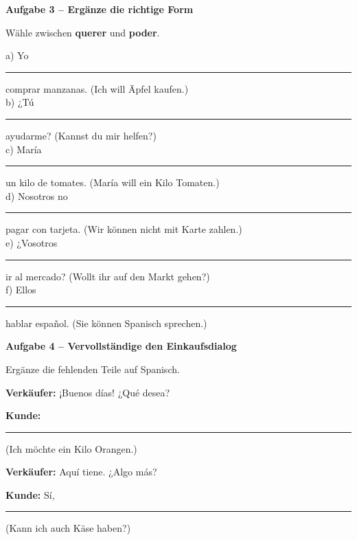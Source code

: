 \documentclass[11pt, a4paper]{article}
\newcommand{\fachfarbe}{spanisch}
\newcommand{\punktebox}[1]{\hfill\fbox{\small \_/#1}}
\newcommand{\luecke}[1]{\rule{#1}{0.4pt}}
\newenvironment{aufgabe}[1]{%
    \needspace{5\baselineskip}%
    \nopagebreak[4]%
    \vspace{10pt}
    \noindent\textbf{\textcolor{\fachfarbe}{Aufgabe #1}}
    \nopagebreak[4]%
    \vspace{5pt}
    \nopagebreak[4]%
    \begin{list}{}{\leftmargin=0pt}
    \item[]
}{%
    \end{list}
}
\newcommand{\es}[1]{\textcolor{\fachfarbe}{\textbf{#1}}}
\begin{document}
\vspace{10pt}


\begin{aufgabe}{3 -- Ergänze die richtige Form}
Wähle zwischen \es{querer} und \es{poder}. \punktebox{6}
\end{aufgabe}

\noindent
a) Yo \luecke{2.5cm} comprar manzanas. (Ich will Äpfel kaufen.) \\[0.8em]
b) ¿Tú \luecke{2.5cm} ayudarme? (Kannst du mir helfen?) \\[0.8em]
c) María \luecke{2.5cm} un kilo de tomates. (María will ein Kilo Tomaten.) \\[0.8em]
d) Nosotros no \luecke{2.5cm} pagar con tarjeta. (Wir können nicht mit Karte zahlen.) \\[0.8em]
e) ¿Vosotros \luecke{2.5cm} ir al mercado? (Wollt ihr auf den Markt gehen?) \\[0.8em]
f) Ellos \luecke{2.5cm} hablar español. (Sie können Spanisch sprechen.) \\

\vspace{15pt}


\begin{aufgabe}{4 -- Vervollständige den Einkaufsdialog}
Ergänze die fehlenden Teile auf Spanisch. \punktebox{6}
\end{aufgabe}

\noindent
\textbf{Verkäufer:} ¡Buenos días! ¿Qué desea?

\vspace{0.8em}

\noindent
\textbf{Kunde:} \luecke{8cm} (Ich möchte ein Kilo Orangen.)

\vspace{0.8em}

\noindent
\textbf{Verkäufer:} Aquí tiene. ¿Algo más?

\vspace{0.8em}

\noindent
\textbf{Kunde:} Sí, \luecke{6cm} (Kann ich auch Käse haben?)

\vspace{0.8em}
\end{document}
